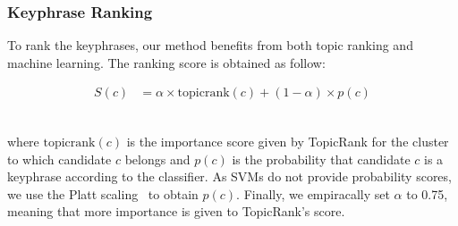    \subsubsection{Keyphrase Ranking}
    \label{subsubsec:keyphrase_ranking}
      To rank the keyphrases, our method benefits from both topic ranking and
      machine learning. The ranking score is obtained as follow:

      \vspace{-1em}

      \begin{footnotesize}
        \begin{align}
          S(c) &= \alpha \times \text{topicrank}(c) + (1 - \alpha) \times p(c)
        \end{align}
      \end{footnotesize}

      \vspace{-2.5em}

      ~\\where $\text{topicrank}(c)$ is the importance score given by TopicRank for
      the cluster to which candidate $c$ belongs and $p(c)$ is the probability
      that candidate $c$ is a keyphrase according to the classifier. As SVMs do
      not provide probability scores, we use the Platt
      scaling~\cite{platt1999probabilisticsvm} to obtain $p(c)$. Finally, we
      empiracally set $\alpha$ to 0.75, meaning that more importance is given to
      TopicRank's score.

